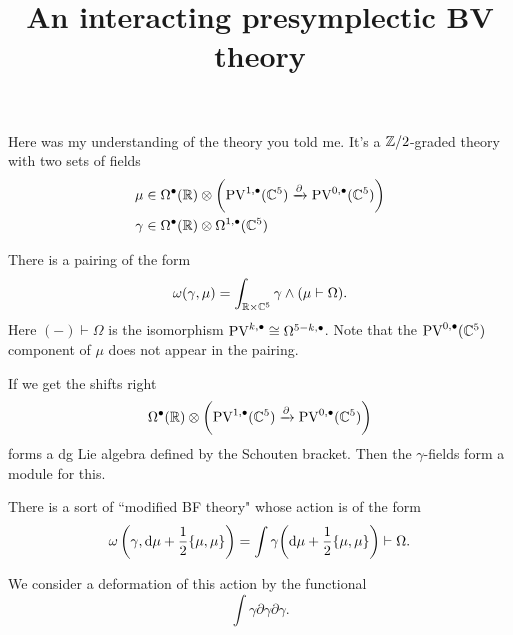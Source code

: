 \documentclass[11pt]{amsart}
\numberwithin{equation}{section}
\def\PV{{\rm PV}}
\begin{document}
\title{An interacting presymplectic BV theory}

\maketitle

\tableofcontents

Here was my understanding of the theory you told me. 
It's a $\mathbb Z/2$-graded theory with two sets of fields
\begin{align*}
\mu & \in \Omega^\bu (\RR) \otimes \bigg(\PV^{1,\bu}(\CC^5) \xto{\partial} \PV^{0,\bu}(\CC^5) \bigg) \\
\gamma & \in \Omega^{\bu}(\RR) \otimes \Omega^{1,\bu}(\CC^5)
\end{align*}

There is a pairing of the form
\[
\omega(\gamma, \mu) = \int_{\mathbb R \times \mathbb C^5} \gamma \wedge (\mu \vdash \Omega) .
\]
Here $(-) \vdash \Omega$ is the isomorphism $\PV^{k, \bu} \cong \Omega^{5-k, \bu}$.
Note that the $\PV^{0,\bu}(\CC^5)$ component of $\mu$ does not appear in the pairing. 

If we get the shifts right 
\[
\Omega^\bu (\RR) \otimes \bigg(\PV^{1,\bu}(\CC^5) \xto{\partial} \PV^{0,\bu}(\CC^5) \bigg)
\] 
forms a dg Lie algebra defined by the Schouten bracket. 
Then the $\gamma$-fields form a module for this.

There is a sort of ``modified BF theory" whose action is of the form
\[
\omega\left(\gamma, {\rm d} \mu + \frac{1}{2} \{\mu, \mu\} \right) = \int \gamma \bigg({\rm d} \mu + \frac12 \{\mu, \mu\} \bigg) \vdash \Omega .
\]

We consider a deformation of this action by the functional
\[
\int \gamma \partial \gamma \partial \gamma .
\]
\end{document}
